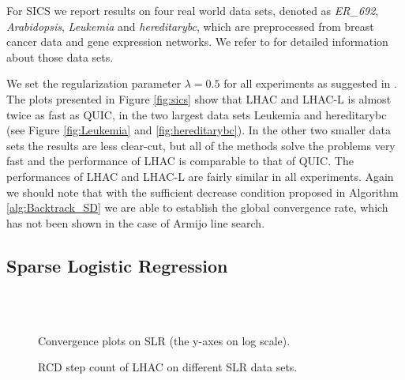 \documentclass[11pt]{article}
\numberwithin{equation}{section}
\begin{document}
For SICS we report results on four real world data sets, denoted as \emph{ER\_692}, \emph{Arabidopsis}, \emph{Leukemia} and \emph{hereditarybc}, which are preprocessed from breast cancer data and gene expression networks. We refer to \cite{Li2010} for detailed information about those data sets.


We set the regularization parameter $\lambda = 0.5$ for all experiments as suggested in \cite{Li2010}. 
The plots presented in Figure \ref{fig:sics} show that LHAC and LHAC-L is almost twice as fast as QUIC,  in the two largest data sets Leukemia and hereditarybc (see Figure \ref{fig:Leukemia} and \ref{fig:hereditarybc}). In the other two smaller data sets the results are less clear-cut, but all of the methods solve the problems very fast and the performance of LHAC is comparable to that of QUIC. The performances of LHAC and LHAC-L are fairly similar in all experiments. Again we should note that with the sufficient decrease condition proposed in Algorithm \ref{alg:Backtrack_SD} we are able to establish the global convergence rate, which has not been shown  in the case of Armijo line search.

\subsection{Sparse Logistic Regression} %
\label{sub:sparse_logistic_regression}
\begin{figure}[!t]
    \centering
    ~
     \\    
    ~
    \caption{ Convergence plots on SLR (the y-axes on log scale). }
    \label{fig:log_reg2}
\end{figure}

\begin{figure}[!t]
    \centering
    \quad
    \caption{ RCD step count of  LHAC on different SLR data sets. }
    \label{fig:slr-cd}   
\end{figure}
\end{document}
